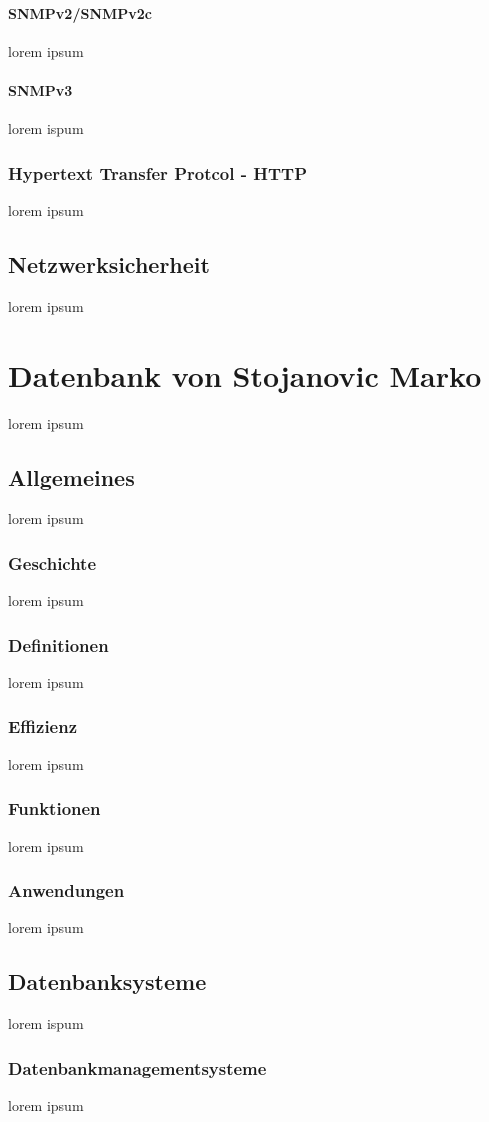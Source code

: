 \documentclass[10pt,a4paper]{report}
\begin{document}
\paragraph{SNMPv2/SNMPv2c}
lorem ipsum
\paragraph{SNMPv3}
lorem ispum
\subsubsection{Hypertext Transfer Protcol - HTTP}
lorem ipsum
\subsection{Netzwerksicherheit}
lorem ipsum
\section{Datenbank von Stojanovic Marko}
lorem ipsum
\subsection{Allgemeines}
lorem ipsum
\subsubsection{Geschichte}
lorem ipsum
\subsubsection{Definitionen}
lorem ipsum
\subsubsection{Effizienz}
lorem ipsum
\subsubsection{Funktionen}
lorem ipsum
\subsubsection{Anwendungen}
lorem ipsum
\subsection{Datenbanksysteme}
lorem ispum
\subsubsection{Datenbankmanagementsysteme}
lorem ipsum
\end{document}

